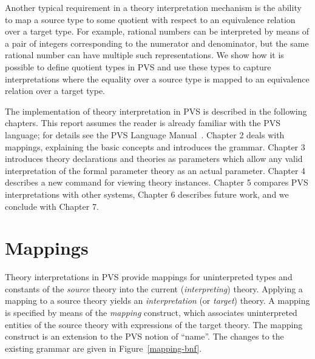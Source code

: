 \documentclass[11pt,twoside,openright,titlepage]{cslreport}
\begin{document}
Another typical requirement in a theory interpretation mechanism is the
ability to map a source type to some quotient with respect to an
equivalence relation over a target type.  For example, rational numbers
can be interpreted by means of a pair of integers corresponding to the
numerator and denominator, but the same rational number can have multiple
such representations.  We show how it is possible to define quotient types
in PVS and use these types to capture interpretations where the equality
over a source type is mapped to an equivalence relation over a target
type.

The implementation of theory interpretation in PVS is described in the
following chapters.  This report assumes the reader is already familiar
with the PVS language; for details see the PVS Language
Manual~\cite{PVS:language}.  Chapter 2 deals with mappings, explaining the
basic concepts and introduces the grammar.  Chapter 3 introduces theory
declarations and theories as parameters which allow any valid
interpretation of the formal parameter theory as an actual parameter.
Chapter 4 describes a new command for viewing theory instances.  Chapter 5
compares PVS interpretations with other systems, Chapter 6 describes
future work, and we conclude with Chapter 7.


\chapter{Mappings}\label{mappings}

Theory interpretations in PVS provide mappings for uninterpreted types and
constants of the \emph{source} theory into the current
(\emph{interpreting}) theory.  Applying a mapping to a source theory
yields an \emph{interpretation} (or \emph{target}) theory.  A mapping is
specified by means of the \emph{mapping} construct, which associates
uninterpreted entities of the source theory with expressions of the target
theory.  The mapping construct is an extension to the PVS notion of
``name''.  The changes to the existing grammar are given in
Figure~\ref{mapping-bnf}.
\end{document}
